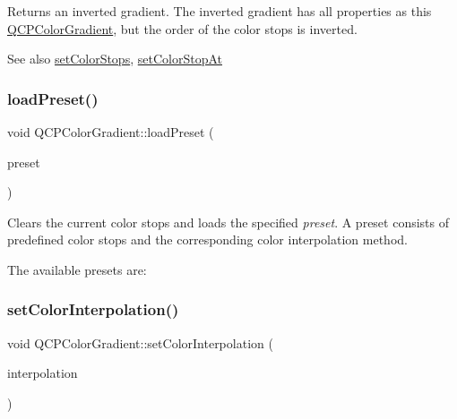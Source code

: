 Returns an inverted gradient. The inverted gradient has all properties as this \hyperlink{class_q_c_p_color_gradient}{Q\+C\+P\+Color\+Gradient}, but the order of the color stops is inverted.

\begin{DoxySeeAlso}{See also}
\hyperlink{class_q_c_p_color_gradient_a724e828aa6f0ba5011a9392477c35d3a}{set\+Color\+Stops}, \hyperlink{class_q_c_p_color_gradient_a3b48be5e78079db1bb2a1188a4c3390e}{set\+Color\+Stop\+At} 
\end{DoxySeeAlso}
\hypertarget{class_q_c_p_color_gradient_aa0aeec1528241728b9671bf8e60b1622}{}\label{class_q_c_p_color_gradient_aa0aeec1528241728b9671bf8e60b1622} 
\subsubsection{\texorpdfstring{load\+Preset()}{loadPreset()}}
{\footnotesize\ttfamily void Q\+C\+P\+Color\+Gradient\+::load\+Preset (\begin{DoxyParamCaption}\item[{\hyperlink{class_q_c_p_color_gradient_aed6569828fee337023670272910c9072}{Gradient\+Preset}}]{preset }\end{DoxyParamCaption})}

Clears the current color stops and loads the specified {\itshape preset}. A preset consists of predefined color stops and the corresponding color interpolation method.

The available presets are\+:  \hypertarget{class_q_c_p_color_gradient_aa13fda86406e1d896a465a409ae63b38}{}\label{class_q_c_p_color_gradient_aa13fda86406e1d896a465a409ae63b38} 
\subsubsection{\texorpdfstring{set\+Color\+Interpolation()}{setColorInterpolation()}}
{\footnotesize\ttfamily void Q\+C\+P\+Color\+Gradient\+::set\+Color\+Interpolation (\begin{DoxyParamCaption}\item[{\hyperlink{class_q_c_p_color_gradient_ac5dca17cc24336e6ca176610e7f77fc1}{Q\+C\+P\+Color\+Gradient\+::\+Color\+Interpolation}}]{interpolation }\end{DoxyParamCaption})}

